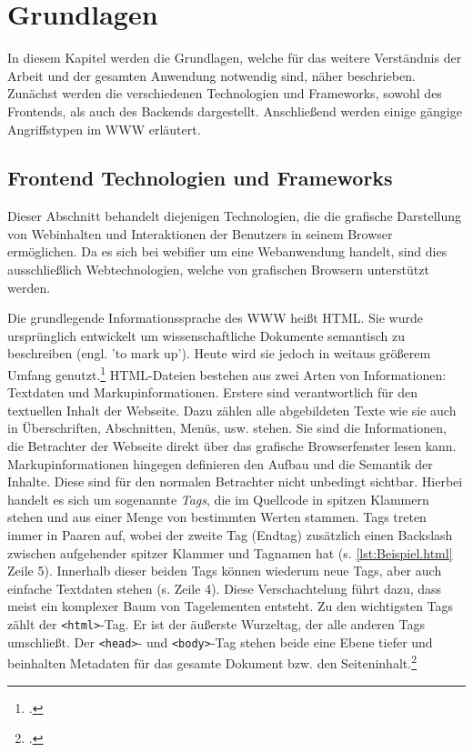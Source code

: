 \chapter{Grundlagen}

In diesem Kapitel werden die Grundlagen, welche für das weitere Verständnis der Arbeit und der gesamten Anwendung notwendig sind, näher beschrieben. Zunächst werden die verschiedenen Technologien und Frameworks, sowohl des Frontends, als auch des Backends dargestellt. Anschließend werden einige gängige Angriffstypen im \ac{WWW} erläutert.

\section{Frontend Technologien und Frameworks}

Dieser Abschnitt behandelt diejenigen Technologien, die die grafische Darstellung von Webinhalten und Interaktionen der Benutzers in seinem Browser ermöglichen. Da es sich bei webifier um eine Webanwendung handelt, sind dies ausschließlich Webtechnologien, welche von grafischen Browsern unterstützt werden.

Die grundlegende Informationssprache des \ac{WWW} heißt \ac{HTML}. Sie wurde ursprünglich entwickelt um wissenschaftliche Dokumente semantisch zu beschreiben (engl. 'to mark up').
Heute wird sie jedoch in weitaus größerem Umfang genutzt.\footcite[Vgl.][]{html5Spec}
\ac{HTML}-Dateien bestehen aus zwei Arten von Informationen: Textdaten und Markupinformationen.
Erstere sind verantwortlich für den textuellen Inhalt der Webseite. Dazu zählen alle abgebildeten Texte wie sie auch in Überschriften, Abschnitten, Menüs, usw. stehen. Sie sind die Informationen, die Betrachter der Webseite direkt über das grafische Browserfenster lesen kann.
Markupinformationen hingegen definieren den Aufbau und die Semantik der Inhalte. Diese sind für den normalen Betrachter nicht unbedingt sichtbar. Hierbei handelt es sich um sogenannte \textit{Tags}, die im Quellcode in spitzen Klammern stehen und aus einer Menge von bestimmten Werten stammen. Tags treten immer in Paaren auf, wobei der zweite Tag (Endtag) zusätzlich einen Backslash zwischen aufgehender spitzer Klammer und Tagnamen hat (s.  \autoref{lst:Beispiel.html} Zeile 5).
Innerhalb dieser beiden Tags können wiederum neue Tags, aber auch einfache Textdaten stehen (s. Zeile 4).
Diese Verschachtelung führt dazu, dass meist ein komplexer Baum von Tagelementen entsteht. Zu den wichtigsten Tags zählt der \lstinline[style=eclipse]{<html>}-Tag. Er ist der äußerste Wurzeltag, der alle anderen Tags umschließt. Der \lstinline[style=eclipse]{<head>}- und \lstinline[style=eclipse]{<body>}-Tag stehen beide eine Ebene tiefer und beinhalten Metadaten für das gesamte Dokument bzw. den Seiteninhalt.\footcite[Vgl.][57]{webTechnologies}

